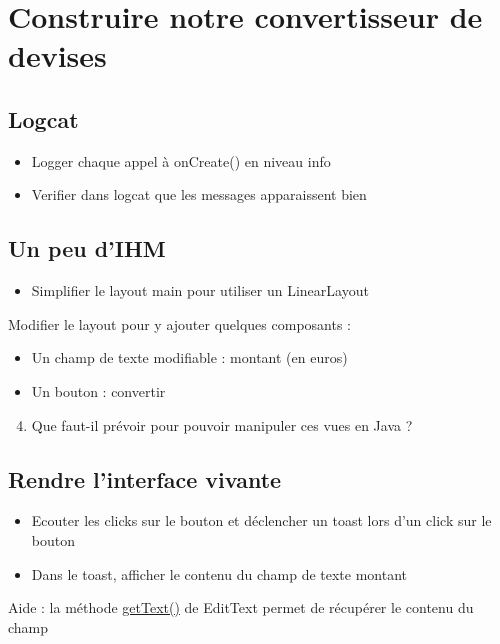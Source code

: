 \documentclass{article}
\begin{document}
\section{Construire notre convertisseur de devises}
\subsection{Logcat}
\begin{itemize}
\item Logger chaque appel à onCreate() en niveau info
\item Verifier dans logcat que les messages apparaissent bien
\end{itemize}
\subsection{Un peu d'IHM}
\begin{itemize}
  \item Simplifier le layout main pour utiliser un LinearLayout
\end{itemize}
Modifier le layout pour y ajouter quelques composants :
\begin{itemize}
\item Un champ de texte modifiable : montant (en euros)
\item Un bouton : convertir
\end{itemize}
\begin{enumerate}
 \setcounter{enumi}{3}
\item Que faut-il prévoir pour pouvoir manipuler ces vues en Java ?
\end{enumerate}
\subsection{Rendre l'interface vivante}
\begin{itemize}
\item Ecouter les clicks sur le bouton et déclencher un toast lors d'un click sur le bouton
\item Dans le toast, afficher le contenu du champ de texte montant
\end{itemize}
Aide : la méthode
\href{http://developer.android.com/reference/android/widget/EditText.html#getText()}{getText()} de EditText permet de récupérer le contenu du champ
\end{document}
